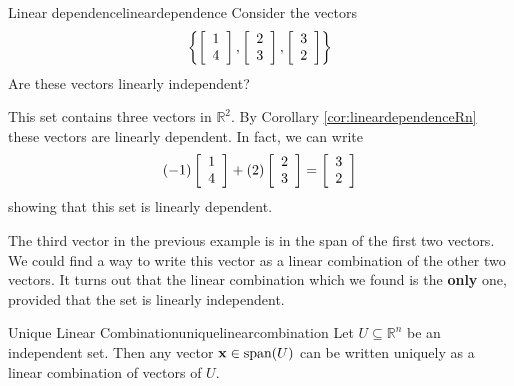 \begin{example}{Linear dependence}{lineardependence}
Consider the vectors 
\[
\left\{ \left[ \begin{array}{r}
1 \\
4 
\end{array}
\right], 
\left[ \begin{array}{r}
2 \\
3
\end{array}
\right], 
\left[ \begin{array}{r}
3 \\
2
\end{array}
\right] \right\}
\]
Are these vectors linearly independent?
\end{example}

\begin{solution}
This set contains three vectors in $\mathbb{R}^2$. By Corollary \ref{cor:lineardependenceRn} these vectors are linearly dependent.
In fact, we can write
\[
(-1) \left[ \begin{array}{r}
1 \\
4 
\end{array}
\right] + (2) 
\left[ \begin{array}{r}
2 \\
3
\end{array}
\right] = 
\left[ \begin{array}{r}
3 \\
2
\end{array}
\right]
\]
showing that this set is linearly dependent. 
\end{solution}

The third vector in the previous example is in the span of the first two vectors. We could find a way to write this vector as a linear combination of the other two vectors. It turns out that the linear combination which we found is the \textbf{only} one, provided that the set is linearly independent. 

\begin{theorem}{Unique Linear Combination}{uniquelinearcombination}
Let $U \subseteq\mathbb{R}^n$ be an independent set.
Then any vector ${\bf x}\in\mbox{span}(U)$ can be written uniquely as a linear combination of vectors of $U$.
\end{theorem}


